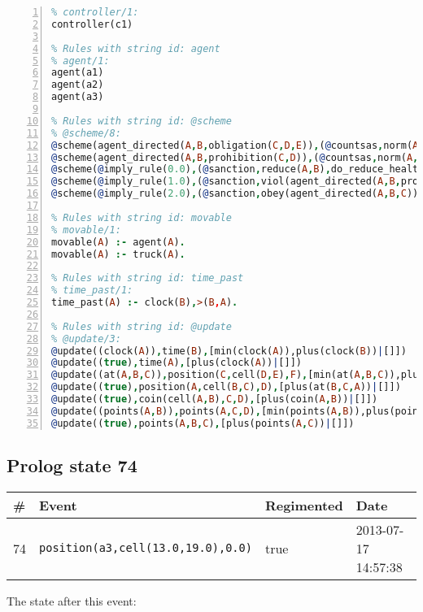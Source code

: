 \documentclass[11pt]{article}\usepackage[utf8]{inputenc}\usepackage{geometry}
\begin{document}
\begin{lstlisting}[language=Prolog, numbers=left]
% Rules with string id: controller
% controller/1:
controller(c1)

% Rules with string id: agent
% agent/1:
agent(a1)
agent(a2)
agent(a3)

% Rules with string id: @scheme
% @scheme/8:
@scheme(agent_directed(A,B,obligation(C,D,E)),(@countsas,norm(A,B,F,obligation(C,D,E)),F),false,(listTrue(C)),(time_past(D)),false,[plus(viol(agent_directed(A,B,obligation(C,D,E))))|[]],[plus(obey(agent_directed(A,B,obligation(C,D,E))))|[]])
@scheme(agent_directed(A,B,prohibition(C,D)),(@countsas,norm(A,B,E,prohibition(C,D)),E),(listTrue(C)),false,(false),false,[plus(viol(agent_directed(A,B,prohibition(C,D))))|[]],[plus(obey(agent_directed(A,B,prohibition(C,D))))|[]])
@scheme(@imply_rule(0.0),(@sanction,reduce(A,B),do_reduce_health(A,B),notifyAgent(A,changed(status))),true,false,false,false,[min(reduce(A,B))|[]],[])
@scheme(@imply_rule(1.0),(@sanction,viol(agent_directed(A,B,prohibition(C,D))),do_sanction(D)),true,false,false,false,[min(viol(agent_directed(A,B,prohibition(C,D))))|[]],[])
@scheme(@imply_rule(2.0),(@sanction,obey(agent_directed(A,B,C))),true,false,false,false,[min(obey(agent_directed(A,B,C)))|[]],[])

% Rules with string id: movable
% movable/1:
movable(A) :- agent(A).
movable(A) :- truck(A).

% Rules with string id: time_past
% time_past/1:
time_past(A) :- clock(B),>(B,A).

% Rules with string id: @update
% @update/3:
@update((clock(A)),time(B),[min(clock(A)),plus(clock(B))|[]])
@update((true),time(A),[plus(clock(A))|[]])
@update((at(A,B,C)),position(C,cell(D,E),F),[min(at(A,B,C)),plus(at(D,E,C))|[]])
@update((true),position(A,cell(B,C),D),[plus(at(B,C,A))|[]])
@update((true),coin(cell(A,B),C,D),[plus(coin(A,B))|[]])
@update((points(A,B)),points(A,C,D),[min(points(A,B)),plus(points(A,D))|[]])
@update((true),points(A,B,C),[plus(points(A,C))|[]])

\end{lstlisting}
\clearpage 
\subsection{Prolog state 74}
\begin{table}[ht]
\centering 
\begin{tabular}{l l l l} 
\textbf{\#} & \textbf{Event} & \textbf{Regimented} & \textbf{Date} \\ [0.5ex] 
\hline
74&\texttt{position(a3,cell(13.0,19.0),0.0)}&true&2013-07-17 14:57:38\\ [1ex] \hline\end{tabular}
\end{table}
The state after this event:
\end{document}
